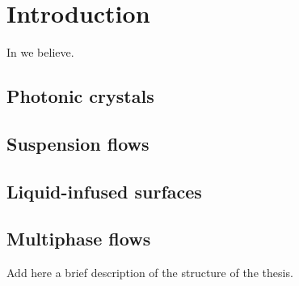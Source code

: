 \graphicspath{{imgs/}}

\chapter{Introduction}
%


In \cite{Batchelor} we believe.


\section{Photonic crystals}
%

\section{Suspension flows}

\section{Liquid-infused surfaces}

\section{Multiphase flows}

\thesisstructure Add here a brief description of the structure of the thesis.

